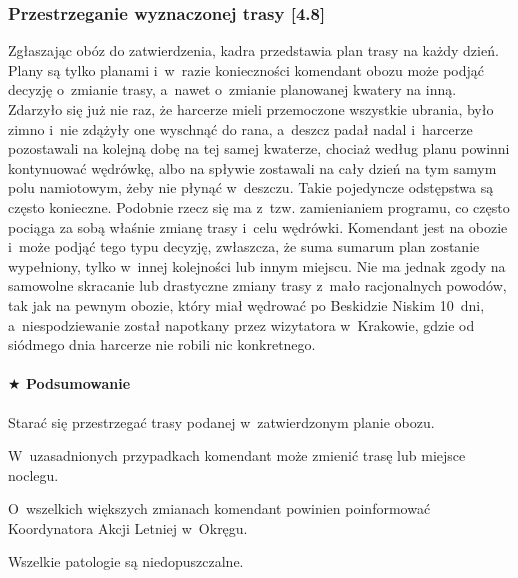 \documentclass[a5paper,10pt,titlepage,twoside]{article}
\newcommand*{\thecheckbox}{\hss$\Box$} %
\newenvironment*{checklist}
{\list{}{%
\renewcommand*{\makelabel}[1]{\thecheckbox}}}
{\endlist}
\begin{document}
\subsubsection{Przestrzeganie wyznaczonej trasy [4.8]}
Zgłaszając obóz do zatwierdzenia, kadra przedstawia plan trasy na każdy dzień. Plany są tylko planami i~w~razie konieczności komendant obozu może podjąć decyzję o~zmianie trasy, a~nawet o~zmianie planowanej kwatery na inną. Zdarzyło się już nie raz, że harcerze mieli przemoczone wszystkie ubrania, było zimno i~nie zdążyły one wyschnąć do rana, a~deszcz padał nadal i~harcerze pozostawali na kolejną dobę na tej samej kwaterze, chociaż według planu powinni kontynuować wędrówkę, albo na spływie zostawali na cały dzień na tym samym polu namiotowym, żeby nie płynąć w~deszczu. Takie pojedyncze odstępstwa są często konieczne. Podobnie rzecz się ma z~tzw. zamienianiem programu, co często pociąga za sobą właśnie zmianę trasy i~celu wędrówki. Komendant jest na obozie i~może podjąć tego typu decyzję, zwłaszcza, że suma sumarum plan zostanie wypełniony, tylko w~innej kolejności lub innym miejscu. Nie ma jednak zgody na samowolne skracanie lub drastyczne zmiany trasy z~mało racjonalnych powodów, tak jak na pewnym obozie, który miał wędrować po Beskidzie Niskim 10~dni, a~niespodziewanie został napotkany przez wizytatora w~Krakowie, gdzie od siódmego dnia harcerze nie robili nic konkretnego.
\paragraph{$\bigstar$ Podsumowanie}
\begin{checklist}
\item Starać się przestrzegać trasy podanej w~zatwierdzonym planie obozu.
\item W~uzasadnionych przypadkach komendant może zmienić trasę lub miejsce noclegu.
\item O~wszelkich większych zmianach komendant powinien poinformować Koordynatora Akcji Letniej w~Okręgu.
\item Wszelkie patologie są niedopuszczalne.
\end{checklist}
\end{document}
